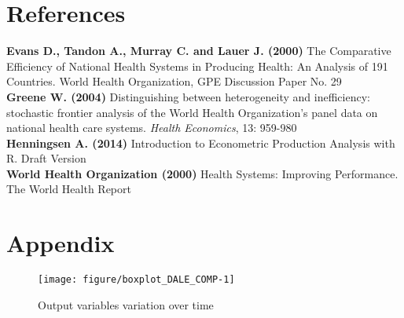 \documentclass[12pt,a4paper]{article}\usepackage[]{graphicx}\usepackage[]{color}
\newenvironment{knitrout}{}{} %
\begin{document}
\newpage
\section{References}
\textbf{Evans D., Tandon A., Murray C. and Lauer J. (2000)} The Comparative Efficiency of National Health Systems in Producing Health: An Analysis of 191 Countries. World Health Organization, GPE Discussion Paper No. 29 \\

\textbf{Greene W. (2004)} Distinguishing between heterogeneity and inefficiency: stochastic frontier analysis of the World Health Organization's panel data on national health care systems. \textit{Health Economics}, 13: 959-980 \\

\textbf{Henningsen A. (2014)} Introduction to Econometric Production Analysis with R. Draft Version \\

\textbf{World Health Organization (2000)} Health Systems: Improving Performance. The World Health Report



\newpage
\section{Appendix}


\begin{knitrout}
\color{fgcolor}\begin{figure}[htbp]

{\centering \texttt{[image: figure/boxplot\_DALE\_COMP-1]} 

}

\caption[Output variables variation over time]{Output variables variation over time}\label{fig:boxplot_DALE_COMP}
\end{figure}


\end{knitrout}




\end{document}
